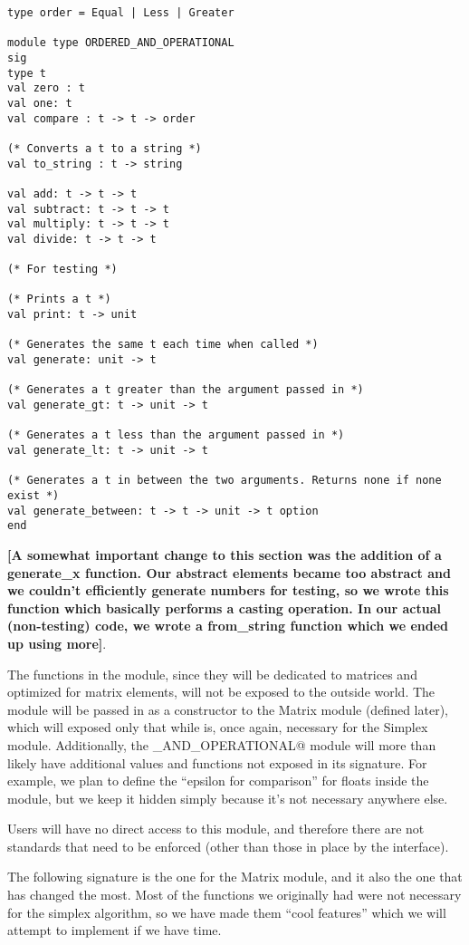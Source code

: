 \documentclass[letterpaper,11pt]{article}
\newcommand{\annot}[1]{\textbf{\color{BrickRed} [#1]}}
\begin{document}
\begin{verbatim}
type order = Equal | Less | Greater

module type ORDERED_AND_OPERATIONAL
sig
type t
val zero : t
val one: t
val compare : t -> t -> order

(* Converts a t to a string *)
val to_string : t -> string

val add: t -> t -> t
val subtract: t -> t -> t
val multiply: t -> t -> t
val divide: t -> t -> t

(* For testing *)

(* Prints a t *)
val print: t -> unit

(* Generates the same t each time when called *)
val generate: unit -> t

(* Generates a t greater than the argument passed in *)
val generate_gt: t -> unit -> t

(* Generates a t less than the argument passed in *)
val generate_lt: t -> unit -> t

(* Generates a t in between the two arguments. Returns none if none exist *)
val generate_between: t -> t -> unit -> t option
end
\end{verbatim}

{\annot{A somewhat important change to this section was the addition of a 
generate\_x function. Our abstract elements became too abstract and we
couldn't efficiently generate numbers for testing, so we wrote this function which
basically performs a casting operation. In our actual (non-testing) code, we
wrote a from\_string function which we ended up using more}}.

The functions in the module, since they will be dedicated to matrices and
optimized for matrix elements, will not be exposed to the outside world. The
module will be passed in as a constructor to the Matrix module (defined later),
which will exposed only that while is, once again, necessary for the Simplex
module. Additionally, the \verb@ORDERED_AND_OPERATIONAL@ module will more than
likely have additional values and functions not exposed in its signature. For
example, we plan to define the “epsilon for comparison” for floats inside the
module, but we keep it hidden simply because it's not necessary anywhere else.

Users will have no direct access to this module, and therefore there are not
standards that need to be enforced (other than those in place by the interface).

The following signature is the one for the Matrix module, and it also the one
that has changed the most. Most of the functions we originally had were not
necessary for the simplex algorithm, so we have made them ``cool features''
which we will attempt to implement if we have time.
\end{document}

